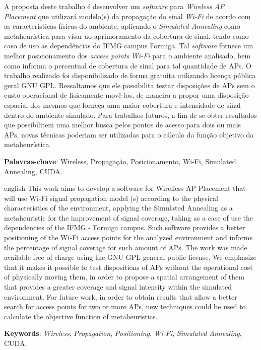 \documentclass[
	12pt,				%
	openright,			%
	twoside,			%
	a4paper,			%
	english,			%
	french,				%
	spanish,			%
	brazil				%
	]{abntex2}
\begin{document}
\setlength{\absparsep}{18pt} %
\begin{resumo}
A proposta deste trabalho é desenvolver um \textit{software} para \textit{Wireless AP Placement}  que utilizará modelo(s) da propagação do sinal \textit{Wi-Fi} de acordo com as características físicas do ambiente, aplicando o \textit{Simulated Annealing} como metaheurística para visar ao aprimoramento da cobertura de sinal, tendo como caso de uso as dependências do IFMG campus Formiga. Tal \textit{software} fornece um melhor posicionamento dos \textit{access points} \textit{Wi-Fi} para o ambiente analisado, bem como informa o percentual de cobertura de sinal para tal quantidade de APs. O trabalho realizado foi disponibilizado de forma gratuita utilizando licença pública geral GNU GPL. Ressaltamos que ele possibilita testar disposições de APs sem o custo operacional de fisicamente movê-los, de maneira a propor uma disposição espacial dos mesmos que forneça uma maior cobertura e intensidade de sinal dentro do ambiente simulado. Para trabalhos futuros, a fim de se obter resultados que possibilitem uma melhor busca pelos pontos de acesso para dois ou mais APs, novas técnicas poderiam ser utilizadas para o cálculo da função objetivo da metaheurística. 

 \textbf{Palavras-chave}:  Wireless, Propagação, Posicionamento, Wi-Fi, Simulated Annealing, CUDA.
\end{resumo}

\begin{resumo}[Abstract]
 \begin{otherlanguage*}{english}
   This work aims to develop a software for Wirelless AP Placement that will use Wi-Fi signal propagation model (s) according to the physical characteristics of the environment, applying the Simulated Annealing as a metaheuristic for the improvement of signal coverage, taking as a case of use the dependencies of the IFMG - Formiga campus. Such software provides a better positioning of the Wi-Fi access points for the analyzed environment and informs the percentage of signal coverage for such amount of APs. The work was made available free of charge using the GNU GPL general public license. We emphasize that it makes it possible to test dispositions of APs without the operational cost of physically moving them, in order to propose a spatial arrangement of them that provides a greater coverage and signal intensity within the simulated environment. For future work, in order to obtain results that allow a better search for access points for two or more APs, new techniques could be used to calculate the objective function of metaheuristics.

   \vspace{\onelineskip}
 
   \noindent 
   \textbf{Keywords}: \textit{Wireless}, \textit{Propagation}, \textit{Positioning}, \textit{Wi-Fi}, \textit{Simulated Annealing}, CUDA.
 \end{otherlanguage*}
\end{resumo}
\end{document}
